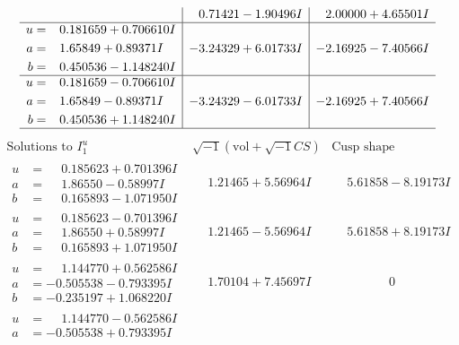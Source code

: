 \documentclass[1p]{elsarticle_modified}
\theoremstyle{definition}
\newcommand{\I}{\sqrt{-1}}
\begin{document}
$$\begin{array}{c|c|c}
 & \phantom{-}0.71421 - 1.90496 I & \phantom{-}2.00000 + 4.65501 I \\ \hline\begin{aligned}
u &= \phantom{-}0.181659 + 0.706610 I \\
a &= \phantom{-}1.65849 + 0.89371 I \\
b &= \phantom{-}0.450536 - 1.148240 I\end{aligned}
 & -3.24329 + 6.01733 I & -2.16925 - 7.40566 I \\ \hline\begin{aligned}
u &= \phantom{-}0.181659 - 0.706610 I \\
a &= \phantom{-}1.65849 - 0.89371 I \\
b &= \phantom{-}0.450536 + 1.148240 I\end{aligned}
 & -3.24329 - 6.01733 I & -2.16925 + 7.40566 I\\
 \hline 
 \end{array}$$\newpage$$\begin{array}{c|c|c}  
\text{Solutions to }I^u_{1}& \I (\text{vol} + \sqrt{-1}CS) & \text{Cusp shape}\\
 \hline 
\begin{aligned}
u &= \phantom{-}0.185623 + 0.701396 I \\
a &= \phantom{-}1.86550 - 0.58997 I \\
b &= \phantom{-}0.165893 - 1.071950 I\end{aligned}
 & \phantom{-}1.21465 + 5.56964 I & \phantom{-}5.61858 - 8.19173 I \\ \hline\begin{aligned}
u &= \phantom{-}0.185623 - 0.701396 I \\
a &= \phantom{-}1.86550 + 0.58997 I \\
b &= \phantom{-}0.165893 + 1.071950 I\end{aligned}
 & \phantom{-}1.21465 - 5.56964 I & \phantom{-}5.61858 + 8.19173 I \\ \hline\begin{aligned}
u &= \phantom{-}1.144770 + 0.562586 I \\
a &= -0.505538 - 0.793395 I \\
b &= -0.235197 + 1.068220 I\end{aligned}
 & \phantom{-}1.70104 + 7.45697 I & \phantom{-0.000000 } 0 \\ \hline\begin{aligned}
u &= \phantom{-}1.144770 - 0.562586 I \\
a &= -0.505538 + 0.793395 I \\

\end{aligned}
\end{array}$$
\end{document}
